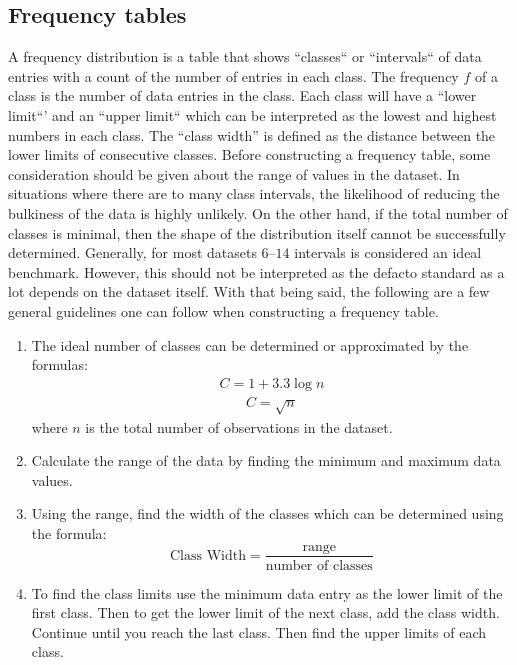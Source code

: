 \subsection{Frequency tables}
A frequency distribution is a table that shows ``classes`` or ``intervals`` of data 
entries with a count of the number of entries in each class. The frequency $f$ of 
a class is the number of data entries in the class. Each class will have a 
``lower limit``' and an ``upper limit`` which can be interpreted as the 
lowest and highest numbers in each class. The “class width” is defined as the 
distance between the lower limits of consecutive classes. Before constructing a 
frequency table, some consideration should be given about the range of values in 
the dataset. In situations where there are to many class intervals, the likelihood 
of reducing the bulkiness of the data is highly unlikely. On the other hand, if 
the total number of classes is minimal, then the shape of the distribution itself 
cannot be successfully determined. Generally, for most datasets $6–14$ intervals 
is considered an ideal benchmark. However, this should not be interpreted as the 
defacto standard as a lot depends on the dataset itself. With that being said, 
the following are a few general guidelines one can follow when constructing a 
frequency table. 

\begin{enumerate}
    \item The ideal number of classes can be determined or approximated by the 
    formulas: 
    \begin{align}
        C = 1 + 3.3\log{n} %
    \end{align}
    \begin{align}
        C = \sqrt{n} %
    \end{align}
    where $n$ is the total number of observations in the dataset. 
    \item Calculate the range of the data by finding the minimum and maximum data 
    values. 
    \item  Using the range, find the width of the classes which can be determined
    using the formula:
    \begin{equation}
        \mbox{Class Width} = \frac{\mbox{range}}{\mbox{number of classes}}
    \end{equation}
    \item To find the class limits use the minimum data entry as the lower limit 
    of the first class. Then to get the lower limit of the next class, add the 
    class width. Continue until you reach the last class. Then find the upper 
    limits of each class.
\end{enumerate}

